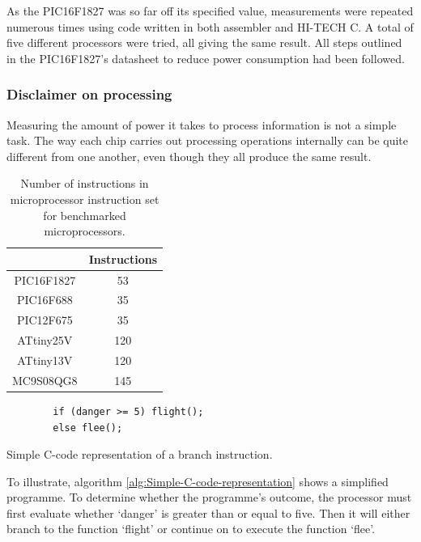       As the PIC16F1827 was so far off its specified value, measurements were repeated numerous times using code written in both assembler and HI-TECH C.
      A total of five different processors were tried, all giving the same result.
      All steps outlined in the PIC16F1827's datasheet to reduce power consumption had been followed.


    \subsubsection*{Disclaimer on processing}


      Measuring the amount of power it takes to process information is not a simple task.
      The way each chip carries out processing operations internally can be quite different from one another, even though they
      all produce the same result.

      \begin{table}
        \centering
        \begin{tabular}{|c|c|}
          \cline{2-2}
          \multicolumn{1}{c|}{} & Instructions\tabularnewline
          \hline
          PIC16F1827 & 53\tabularnewline
          \hline
          PIC16F688 & 35\tabularnewline
          \hline
          PIC12F675 & 35\tabularnewline
          \hline
          ATtiny25V & 120\tabularnewline
          \hline
          ATtiny13V & 120\tabularnewline
          \hline
          MC9S08QG8 & 145\tabularnewline
          \hline
        \end{tabular}
        \caption{\label{tab:Number-of-instructions}Number of instructions in microprocessor instruction set for benchmarked microprocessors.}
      \end{table}


      \begin{algorithm}
        \begin{lstlisting}
        if (danger >= 5) flight();
        else flee();
        \end{lstlisting}
        \caption{\label{alg:Simple-C-code-representation}Simple C-code representation of a branch instruction.}
      \end{algorithm}


      To illustrate, algorithm \ref{alg:Simple-C-code-representation} shows a simplified programme.
      To determine whether the programme's outcome, the processor must first evaluate whether `danger' is greater than or equal to five.
      Then it will either branch to the function `flight' or continue on to execute the function `flee'.

